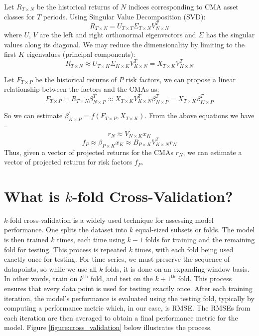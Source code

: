 \documentclass{ledger}
\begin{document}
Let $R_{T \times N}$ be the historical returns of $N$ indices corresponding to CMA asset classes for $T$ periods. Using Singular Value Decomposition (SVD):
\begin{equation}
	R_{T \times N} = U_{T \times T} \Sigma_{T \times N} V_{N \times N}^{T}
\end{equation}
where $U$, $V$ are the left and right orthonormal eigenvectors and $\Sigma$ has the singular values along its diagonal. We may reduce the dimensionality by limiting to the first $K$ eigenvalues (principal components):
\begin{equation} 
	R_{T \times N} \approx U_{T \times K} \Sigma_{K \times K} V_{K \times N}^{T} = X_{T \times K} V_{K \times N}^{T} 
\end{equation}

Let $F_{T \times P}$ be the historical returns of $P$ risk factors, we can propose a linear relationship between the factors and the CMAs as:
\begin{equation} 
	F_{T \times P} = R_{T \times N} \beta_{N \times P}^{T} \approx X_{T \times K} V_{K \times N}^{T} \beta_{N \times P}^{T} = X_{T \times K} \beta_{K \times P}^{T} 
\end{equation}

So we can estimate $\beta_{K \times P}^{\prime} = f(F_{T \times P}, X_{T \times K})$. From the above equations we have --
\begin{equation} r_{N} \approx V_{N \times K} x_{K} \end{equation}
\begin{equation} f_{P} \approx \beta_{P \times K} x_{K} \approx B_{P \times K} V_{K \times N}^{T} r_{N} \end{equation}
Thus, given a vector of projected returns for the CMAs $r_{N}$, we can estimate a vector of projected returns for risk factors $f_{P}$.

\section{What is $k$-fold Cross-Validation?}

$k$-fold cross-validation is a widely used technique for assessing model performance. One splits the dataset into $k$ equal-sized subsets or folds. The model is then trained $k$ times, each time using $k-1$ folds for training and the remaining fold for testing. This process is repeated $k$ times, with each fold being used exactly once for testing. For time series, we must preserve the sequence of datapoints, so while we use all $k$ folds, it is done on an expanding-window basis. In other words, train on $k^{\text{th}}$ fold, and test on the $k+1^{\text{th}}$ fold. This process ensures that every data point is used for testing exactly once. After each training iteration, the model's performance is evaluated using the testing fold, typically by computing a performance metric which, in our case, is RMSE. The RMSEs from each iteration are then averaged to obtain a final performance metric for the model. Figure \ref{figure:cross_validation} below illustrates the process. \\
\end{document}
